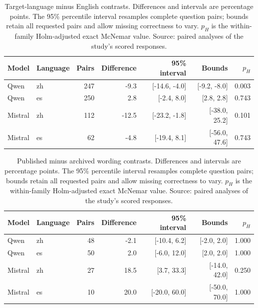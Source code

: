 \begin{table}[ht]
\centering\small
\caption{Target-language minus English contrasts. Differences and intervals are percentage points. The 95\% percentile interval resamples complete question pairs; bounds retain all requested pairs and allow missing correctness to vary. $p_H$ is the within-family Holm-adjusted exact McNemar value. Source: paired analyses of the study's scored responses.}
\begin{tabular}{llrrrrr}\toprule
Model & Language & Pairs & Difference & 95\% interval & Bounds & $p_H$\\\midrule
Qwen & zh & 247 & -9.3 & [-14.6, -4.0] & [-9.2, -8.0] & 0.003\\
Qwen & es & 250 & 2.8 & [-2.4, 8.0] & [2.8, 2.8] & 0.743\\
Mistral & zh & 112 & -12.5 & [-23.2, -1.8] & [-38.0, 25.2] & 0.101\\
Mistral & es & 62 & -4.8 & [-19.4, 8.1] & [-56.0, 47.6] & 0.743\\
\bottomrule
\end{tabular}\label{tab:fresh-language}
\end{table}
\begin{table}[ht]
\centering\small
\caption{Published minus archived wording contrasts. Differences and intervals are percentage points. The 95\% percentile interval resamples complete question pairs; bounds retain all requested pairs and allow missing correctness to vary. $p_H$ is the within-family Holm-adjusted exact McNemar value. Source: paired analyses of the study's scored responses.}
\begin{tabular}{llrrrrr}\toprule
Model & Language & Pairs & Difference & 95\% interval & Bounds & $p_H$\\\midrule
Qwen & zh & 48 & -2.1 & [-10.4, 6.2] & [-2.0, 2.0] & 1.000\\
Qwen & es & 50 & 2.0 & [-6.0, 12.0] & [2.0, 2.0] & 1.000\\
Mistral & zh & 27 & 18.5 & [3.7, 33.3] & [-14.0, 42.0] & 0.250\\
Mistral & es & 10 & 20.0 & [-20.0, 60.0] & [-50.0, 70.0] & 1.000\\
\bottomrule
\end{tabular}\label{tab:fresh-wording}
\end{table}
